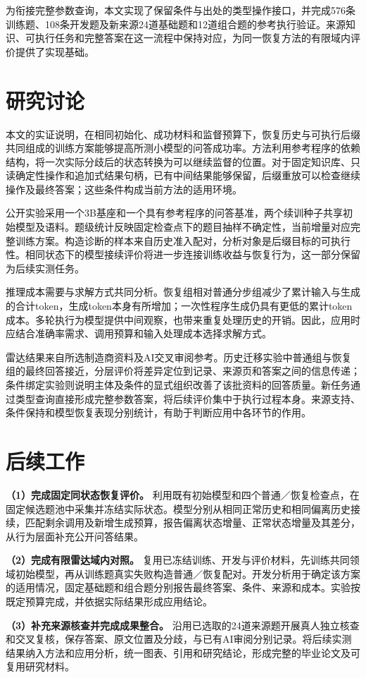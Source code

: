为衔接完整参数查询，本文实现了保留条件与出处的类型操作接口，并完成576条训练题、108条开发题及新来源24道基础题和12道组合题的参考执行验证。来源知识、可执行任务和完整答案在这一流程中保持对应，为同一恢复方法的有限域内评价提供了实现基础。

\section{研究讨论}

本文的实证说明，在相同初始化、成功材料和监督预算下，恢复历史与可执行后缀共同组成的训练方案能够提高所测小模型的问答成功率。方法利用参考程序的依赖结构，将一次实际分歧后的状态转换为可以继续监督的位置。对于固定知识库、只读确定性操作和追加式结果句柄，已有中间结果能够保留，后缀重放可以检查继续操作及最终答案；这些条件构成当前方法的适用环境。

公开实验采用一个3B基座和一个具有参考程序的问答基准，两个续训种子共享初始模型及语料。题级统计反映固定检查点下的题目抽样不确定性，当前增量对应完整训练方案。构造诊断的样本来自历史准入配对，分析对象是后缀目标的可执行性。相同状态下的模型接续评价将进一步连接训练收益与恢复行为，这一部分保留为后续实测任务。

推理成本需要与求解方式共同分析。恢复组相对普通分步组减少了累计输入与生成的合计token，生成token本身有所增加；一次性程序生成仍具有更低的累计token成本。多轮执行为模型提供中间观察，也带来重复处理历史的开销。因此，应用时应结合准确率需求、调用预算和输入处理成本选择求解方式。

雷达结果来自所选制造商资料及AI交叉审阅参考。历史迁移实验中普通组与恢复组的最终回答接近，分层评价将差异定位到记录、来源页和答案之间的信息传递；条件绑定实验则说明主体及条件的显式组织改善了该批资料的回答质量。新任务通过类型查询直接形成完整参数答案，将后续评价集中于执行过程本身。来源支持、条件保持和模型恢复表现分别统计，有助于判断应用中各环节的作用。

\section{后续工作}

\textbf{（1）完成固定同状态恢复评价。}
利用既有初始模型和四个普通／恢复检查点，在固定候选题池中采集并冻结实际状态。模型分别从相同正常历史和相同偏离历史接续，匹配剩余调用及新增生成预算，报告偏离状态增量、正常状态增量及其差分，从行为层面补充公开问答结果。

\textbf{（2）完成有限雷达域内对照。}
复用已冻结训练、开发与评价材料，先训练共同领域初始模型，再从训练题真实失败构造普通／恢复配对。开发分析用于确定该方案的适用情况，固定基础题和组合题分别报告最终答案、条件、来源和成本。实验按既定预算完成，并依据实际结果形成应用结论。

\textbf{（3）补充来源核查并完成成果整合。}
沿用已选取的24道来源题开展真人独立核查和交叉复核，保存答案、原文位置及分歧，与已有AI审阅分别记录。将后续实测结果纳入方法和应用分析，统一图表、引用和研究结论，形成完整的毕业论文及可复用研究材料。
